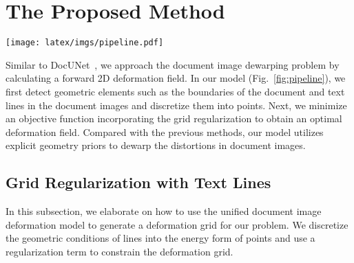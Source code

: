 \documentclass[10pt,twocolumn,letterpaper]{article}
\begin{document}
\section{The Proposed Method}
\begin{figure*}[!t]
  \centering
\texttt{[image: latex/imgs/pipeline.pdf]}
   \vspace{-2mm}
   \caption{The pipeline of the proposed method. Taking a document image as input, DocUNet detects the backward mapping(BM) of document image boundaries by regression and UNet detects text lines by segmentation. The obtained geometric elements are discretized into points and fed into the grid regularization module. The proposed regularization module takes the boundary constraint, text line constraint and the grid regularization term as optimization conditions to calculate a uniform forward map (UV map).}
  \label{fig:pipeline}
\end{figure*}

Similar to DocUNet~\cite{Ma_2018_CVPR}, we approach the document image dewarping problem by calculating a forward 2D deformation field. In our model (Fig.~\ref{fig:pipeline}), we first detect geometric elements such as the boundaries of the document and text lines in the document images and discretize them into points. Next, we minimize an objective function incorporating the grid regularization to obtain an optimal deformation field. Compared with the previous methods, our model utilizes explicit geometry priors to dewarp the distortions in document images. 

\subsection{Grid Regularization with Text Lines}

In this subsection, we elaborate on how to use the unified document image deformation model to generate a deformation grid for our problem.  We discretize the geometric conditions of lines into the energy form of points and use a regularization term to constrain the deformation grid.  
\end{document}
